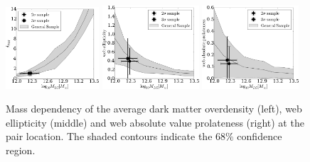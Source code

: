 \documentclass{emulateapj}
\providecommand{\DIFdelend}{} %
\begin{document}
\DIFdelend \begin{figure}
\begin{center}
  \includegraphics[width=0.31\textwidth]{fig2a.pdf}
  \includegraphics[width=0.32\textwidth]{fig2b.pdf}
  \includegraphics[width=0.32\textwidth]{fig2c.pdf}
\caption{Mass dependency of the average dark matter overdensity (left),
  web ellipticity (middle) and web absolute value prolateness (right) at the
  pair location. The shaded contours indicate the $68\%$ confidence region. 
\label{fig:median_overdensity}}
\end{center}
\end{figure}
\end{document}
